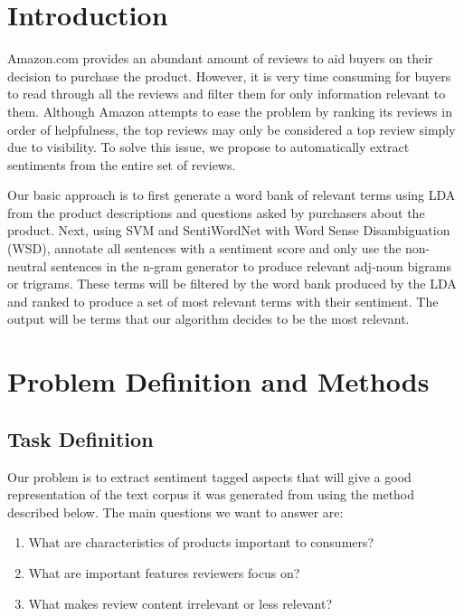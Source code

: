 \documentclass{article}
\begin{document}
 


\section{Introduction}
Amazon.com provides an abundant amount of reviews to aid buyers on their decision to purchase the product. However, it is very time consuming for buyers to read through all the reviews and filter them for only information relevant to them. Although Amazon attempts
to ease the problem by ranking its reviews in order of helpfulness, the top reviews may only be considered a top review simply due to visibility. To solve this issue, we propose to automatically extract sentiments from the entire set of reviews.

Our basic approach is to first generate a word bank of relevant terms using LDA from the product descriptions and questions asked by purchasers about the product. Next, using SVM and SentiWordNet with Word Sense Disambiguation (WSD), annotate all sentences with a sentiment score and only use the non-neutral sentences in the n-gram generator to produce relevant adj-noun bigrams or trigrams. These terms will be filtered by the word bank produced by the LDA and ranked to produce a set of most relevant terms with their sentiment. The output will be terms that our algorithm decides to be the most relevant. 

\section{Problem Definition and Methods} 
 \subsection{Task Definition}
Our problem is to extract sentiment tagged aspects that will give a good representation of the text corpus it was generated from using the method described below. The main questions we want to answer are:
\begin{enumerate}
\item What are characteristics of products important to consumers?
\item What are important features reviewers focus on?
\item What makes review content irrelevant or less relevant?
\end{enumerate}
\end{document}
